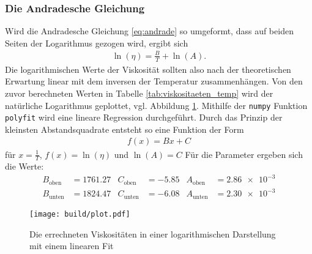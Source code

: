 \subsubsection[]{Die Andradesche Gleichung}
Wird die Andradesche Gleichung \eqref{eq:andrade} so umgeformt, dass auf beiden Seiten der Logarithmus gezogen wird, ergibt sich
\begin{align}
    \ln {\left( \eta \right)} = \frac{B}{T} + \ln{\left( A \right)}.
\end{align}
Die logarithmischen Werte der Viskosität sollten also nach der theoretischen Erwartung linear mit dem inversen der Temperatur zusammenhängen.
Von den zuvor berechneten Werten in Tabelle \ref{tab:viskositaeten_temp} wird der natürliche Logarithmus geplottet, vgl. Abbildung \ref{fig:groKu_steigendeTemp_eta_fit}.
Mithilfe der \texttt{numpy} \cite[]{numpy} Funktion \texttt{polyfit} wird eine lineare Regression durchgeführt.
Durch das Prinzip der kleinsten Abstandsquadrate entsteht so eine Funktion der Form
\begin{align*}
    f(x) = B x + C 
\end{align*}
für $x= \frac{1}{T}$, $f(x)= \ln (\eta)$ und $\ln(A) = C$
Für die Parameter ergeben sich die Werte:
\begin{align*}
    B_\text{oben} &= \num{1761.27} & C_\text{oben} &= \num{-5.85}   & A_\text{oben}  &=  \num{2.86e-3} \\
    B_\text{unten} &= \num{1824.47} & C_\text{unten} &= \num{-6.08} & A_\text{unten} &=  \num{2.30e-3}
\end{align*}
%
\begin{figure}[H]
    \centering
    \texttt{[image: build/plot.pdf]}
    \caption{Die errechneten Viskositäten in einer logarithmischen Darstellung mit einem linearen Fit}
    \label{fig:groKu_steigendeTemp_eta_fit}
\end{figure}
%